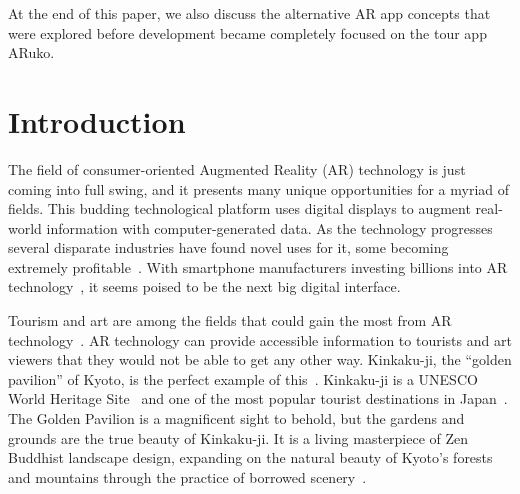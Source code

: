 \documentclass[a4paper, 10pt, american, titlepage]{article}
\begin{document}
At the end of this paper, we also discuss the alternative AR app concepts that
were explored before development became completely focused on the tour app
ARuko.

\clearpage

\begin{singlespace}
	\tableofcontents
	\clearpage

	\listoffigures
	\clearpage

	\listoftables
	\clearpage
\end{singlespace}


\section{Introduction}
\label{sec:introduction}

The field of consumer-oriented Augmented Reality (AR) technology is just coming
into full swing, and it presents many unique opportunities for a myriad of
fields. This budding technological platform uses digital displays to augment
real-world information with computer-generated data. As the technology
progresses several disparate industries have found novel uses for it, some
becoming extremely profitable~\autocite{webster2018}. With smartphone
manufacturers investing billions into AR technology~\autocite{mason2016}, it
seems poised to be the next big digital interface.

Tourism and art are among the fields that could gain the most from AR
technology~\autocite{saenz2009, katz2018}. AR technology can provide accessible
information to tourists and art viewers that they would not be able to get any
other way. Kinkaku-ji, the ``golden pavilion'' of Kyoto, is the perfect example
of this~\autocite{bornoff2000}. Kinkaku-ji is a UNESCO World Heritage
Site~\autocite{unesco} and one of the most popular tourist destinations in
Japan~\autocite{japanguide2019}. The Golden Pavilion is a magnificent sight to
behold, but the gardens and grounds are the true beauty of Kinkaku-ji. It is a
living masterpiece of Zen Buddhist landscape design, expanding on the natural
beauty of Kyoto's forests and mountains through the practice of borrowed
scenery~\autocite{kuitert2002}.
\end{document}
